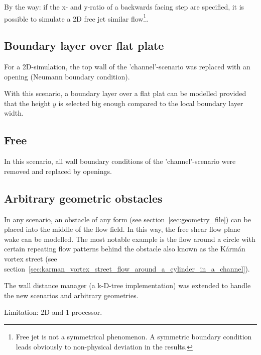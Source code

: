 \noii By the way: if the x- and y-ratio of a backwards facing step are specified, it is possible to simulate a 2D free jet similar flow\footnote{Free jet is not a symmetrical phenomenon. A symmetric boundary condition leads obviously to non-physical deviation in the results.}.


\subsection*{Boundary layer over flat plate} %
\label{sub:boundary_layer_over_flat_plate}

For a 2D-simulation, the top wall of the 'channel'-scenario was replaced with an opening (Neumann boundary condition).

\noii With this scenario, a boundary layer over a flat plat can be modelled provided that the height $y$ is selected big enough compared to the local boundary layer width.

\subsection*{Free} %
\label{sub:free}

In this scenario, all wall boundary conditions of the 'channel'-scenario were removed and replaced by openings.

\subsection*{Arbitrary geometric obstacles} %
\label{sub:arbitrary_geometric_obstacles}

In any scenario, an obstacle of any form (see section~\ref{sec:geometry_file}) can be placed into the middle of the flow field. In this way, the free shear flow plane wake can be modelled. The most notable example is the flow around a circle with certain repeating flow patterns behind the obstacle also known as the K\'{a}rm\'{a}n vortex street (see section~\ref{sec:karman_vortex_street_flow_around_a_cylinder_in_a_channel}).

\noii The wall distance manager (a k-D-tree implementation) was extended to handle the new scenarios and arbitrary geometries.


\noii Limitation: 2D and 1 processor.


